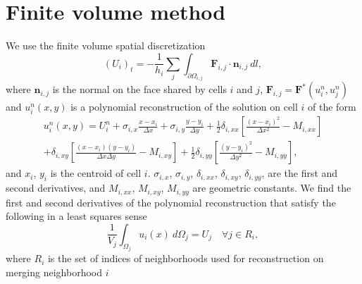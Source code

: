 
\section{Finite volume method}
We use the finite volume spatial discretization 
\begin{equation} 
(U_i)_t =  - \frac{1}{h_i}\sum_{j} \int_{\partial \Omega_{i,j}} \mathbf{F}_{i,j} \cdot \mathbf{n}_{i,j}~dl,\label{eq:scheme}
\end{equation}
where $\mathbf{n}_{i,j}$ is the normal on the face shared by cells $i$ and $j$, $\mathbf{F}_{i,j} = \mathbf{F}^*(u^n_{i},u^n_{j})$ and $u^n_{i}(x,y)$ is a polynomial reconstruction of the solution on cell $i$ of the form
\begin{equation}\label{eq:uhat}
\begin{aligned}
	    u^n_i(x,y) = U^n_{i} +  \sigma_{i,x}\frac{x- x_i}{\Delta x} +   \sigma_{i,y}\frac{y- y_i}{\Delta y} + \frac{1}{2} \delta_{i, xx}\left[ \frac{(x -  x_i)^2 }{\Delta x^2} -  M_{i,xx}\right]\\
	    + \delta_{i, xy}\left[ \frac{(x -  x_i) (y -  y_i) }{\Delta x \Delta y} -  M_{i,xy}\right] + \frac{1}{2} \delta_{i, yy}\left[ \frac{(y -  y_i)^2 }{\Delta y^2} -   M_{i,yy}\right],
\end{aligned}
\end{equation}
and $ x_i$, $ y_i$ is the centroid of cell $i$. $ \sigma_{i,x}$, $ \sigma_{i,y}$, $ \delta_{i,xx}$, $ \delta_{i,xy}$, $ \delta_{i,yy}$, are the first and second derivatives, and $  M_{i,xx}$, $ M_{i,xy}$,  $ M_{i,yy}$ are geometric constants. We find the first and second derivatives of the polynomial reconstruction that satisfy the following in a least squares sense
\begin{equation}\label{eq:qi}
\frac{1}{ V_j}\int_{\Omega_j} u_i(x)~d\Omega_j = U_j \quad \forall j \in R_i,
\end{equation}
where $R_i$ is the set of indices of neighborhoods used for reconstruction on merging neighborhood $i$

